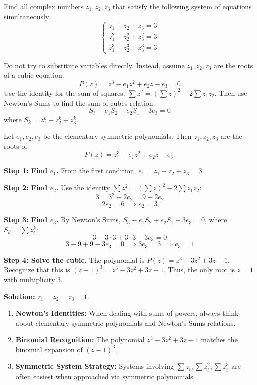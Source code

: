 \begin{problem}
Find all complex numbers $z_1, z_2, z_3$ that satisfy the following system of equations simultaneously:
\[
\begin{cases}
    z_1 + z_2 + z_3 = 3 \\
    z_1^2 + z_2^2 + z_3^2 = 3 \\
    z_1^3 + z_2^3 + z_3^3 = 3
\end{cases}
\]
\end{problem}

\begin{hint}
Do not try to substitute variables directly. Instead, assume $z_1, z_2, z_3$ are the roots of a cubic equation:
\[ P(z) = z^3 - e_1 z^2 + e_2 z - e_3 = 0 \]
Use the identity for the sum of squares: $\sum z^2 = (\sum z)^2 - 2\sum z_1 z_2$.
Then use Newton's Sums to find the sum of cubes relation:
\[ S_3 - e_1 S_2 + e_2 S_1 - 3e_3 = 0 \]
where $S_k = z_1^k + z_2^k + z_3^k$.
\end{hint}

\begin{solution}
Let $e_1, e_2, e_3$ be the elementary symmetric polynomials. Then $z_1, z_2, z_3$ are the roots of 
\[ P(z) = z^3 - e_1 z^2 + e_2 z - e_3. \]

\textbf{Step 1: Find $e_1$.}
From the first condition, $e_1 = z_1 + z_2 + z_3 = 3$.

\textbf{Step 2: Find $e_2$.}
Use the identity $\sum z^2 = (\sum z)^2 - 2\sum z_1 z_2$:
\[ 3 = 3^2 - 2e_2 = 9 - 2e_2 \]
\[ 2e_2 = 6 \implies e_2 = 3 \]

\textbf{Step 3: Find $e_3$.}
By Newton's Sums, $S_3 - e_1 S_2 + e_2 S_1 - 3e_3 = 0$, where $S_k = \sum z_i^k$:
\[ 3 - 3 \cdot 3 + 3 \cdot 3 - 3e_3 = 0 \]
\[ 3 - 9 + 9 - 3e_3 = 0 \implies 3e_3 = 3 \implies e_3 = 1 \]

\textbf{Step 4: Solve the cubic.}
The polynomial is $P(z) = z^3 - 3z^2 + 3z - 1$. 
Recognize that this is $(z-1)^3 = z^3 - 3z^2 + 3z - 1$.
Thus, the only root is $z = 1$ with multiplicity 3.

\textbf{Solution:} $z_1 = z_2 = z_3 = 1$.
\end{solution}

\begin{takeaways}
\begin{enumerate}
    \item \textbf{Newton's Identities:} When dealing with sums of powers, always think about elementary symmetric polynomials and Newton's Sums relations.
    \item \textbf{Binomial Recognition:} The polynomial $z^3 - 3z^2 + 3z - 1$ matches the binomial expansion of $(z-1)^3$.
    \item \textbf{Symmetric System Strategy:} Systems involving $\sum z_i, \sum z_i^2, \sum z_i^3$ are often easiest when approached via symmetric polynomials.
\end{enumerate}
\end{takeaways}

